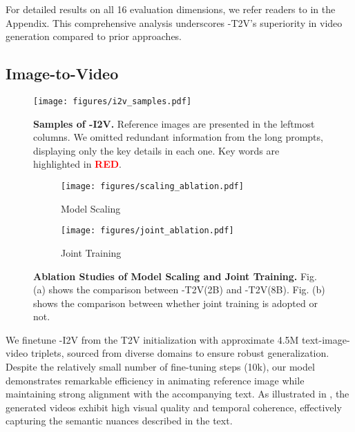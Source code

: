 For detailed results on all 16 evaluation dimensions, we refer readers to  in the Appendix. This comprehensive analysis underscores \ours-T2V's superiority in video generation compared to prior approaches.



\subsection{Image-to-Video}

\begin{figure}[ht]
\centering
\texttt{[image: figures/i2v\_samples.pdf]} \\
\caption{\textbf{Samples of \ours-I2V.} Reference images are presented in the leftmost columns. We omitted redundant information from the long prompts, displaying only the key details in each one. Key words are highlighted in \textcolor{red}{\textbf{RED}}.}\label{fig:i2v}
\end{figure}


\begin{figure}[ht]
    \centering
    \begin{subfigure}[b]{\linewidth}
        \centering
        \texttt{[image: figures/scaling\_ablation.pdf]} 
        \caption{Model Scaling}
        \label{fig:ablation_1}
    \end{subfigure}
    \vfill
    \begin{subfigure}[b]{\linewidth}
        \centering
    \texttt{[image: figures/joint\_ablation.pdf]} 
        \caption{Joint Training}
        \label{fig:ablation_2}
    \end{subfigure}
    \caption{\textbf{Ablation Studies of Model Scaling and Joint Training.} Fig. (a) shows the comparison between \ours-T2V(2B) and \ours-T2V(8B). Fig. (b) shows the comparison  between whether joint training is adopted or not. }
    \label{fig:video-tag}
\end{figure}

We finetune \ours-I2V from the T2V initialization with approximate 4.5M text-image-video triplets, sourced from diverse domains to ensure robust generalization. Despite the relatively small number of fine-tuning steps (10k), our model demonstrates remarkable efficiency in animating reference image while maintaining strong alignment with the accompanying text. As illustrated in , the generated videos exhibit high visual quality and temporal coherence, effectively capturing the semantic nuances described in the text. 

